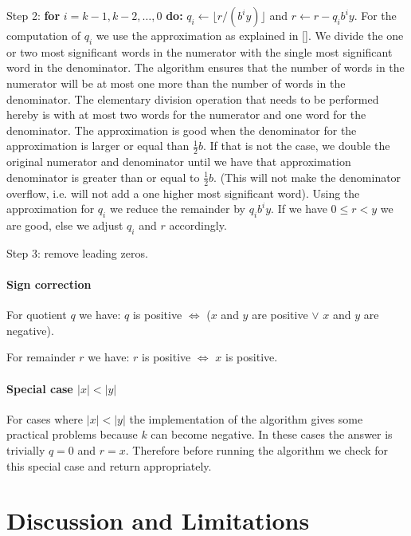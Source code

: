 \documentclass[a4paper]{article}
\begin{document}
Step 2: \textbf{for} $i = k-1, k-2, \ldots, 0$ \textbf{do:}
$q_i \gets \lfloor r / (b^i y) \rfloor$ and $r \gets r - q_i b^i y$.
For the computation of $q_i$ we use the approximation as explained in [\cite{ant}].
We divide the one or two most significant words in the numerator with the single most significant word in the denominator. The algorithm ensures that the number of words in the numerator will be at most one more than the number of words in the denominator.
The elementary division operation that needs to be performed hereby is with at most two words for the numerator and one word for the denominator.
The approximation is good when the denominator for the approximation is larger or equal than $\frac{1}{2} b$. If that is not the case, we double the original numerator and denominator until we have that approximation denominator is greater than or equal to $\frac{1}{2} b$. (This will not make the denominator overflow, i.e. will not add a one higher most significant word).
Using the approximation for $q_i$ we reduce the remainder by $q_i b^i y$.
If we have $0 \le r < y$ we are good, else we adjust $q_i$ and $r$ accordingly.

Step 3: remove leading zeros.


\paragraph{Sign correction}

For quotient $q$ we have: $q$ is positive $\iff$ ($x$ and $y$ are positive $\lor$ $x$ and $y$ are negative).

For remainder $r$ we have: $r$ is positive $\iff$ $x$ is positive.

\paragraph{Special case $|x|<|y|$}

For cases where $|x|<|y|$ the implementation of the algorithm gives some practical problems because $k$ can become negative.
In these cases the answer is trivially $q=0$ and $r=x$.
Therefore before running the algorithm we check for this special case and return appropriately.


\section{Discussion and Limitations}

\end{document}
